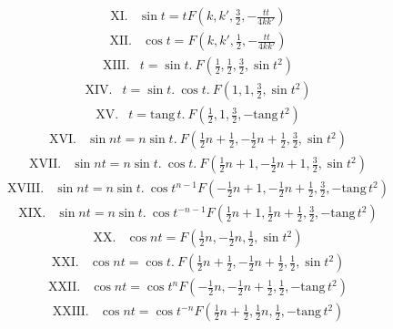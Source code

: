 \[
\begin{array}{rl}
\mathrm{XI.}&\sin t=tF(k,k',\frac{3}{2},-\frac{tt}{4kk'})
\end{array}
\]
\[
\begin{array}{rl}
\mathrm{XII.}&\cos t=F(k,k',\frac{1}{2},-\frac{tt}{4kk'})
\end{array}
\]
\[
\begin{array}{rl}
\mathrm{XIII.}&t=\sin t.\ F(\frac{1}{2},\frac{1}{2},\frac{3}{2},\sin t^2)
\end{array}
\]
\[
\begin{array}{rl}
\mathrm{XIV.}&t=\sin t.\ \cos t.\ F(1,1,\frac{3}{2},\sin t^2)
\end{array}
\]
\[
\begin{array}{rl}
\mathrm{XV.}&t=\mathrm{tang}\,t.\ F(\frac{1}{2},1,\frac{3}{2},-\mathrm{tang}\,t^2)
\end{array}
\]
\[
\begin{array}{rl}
\mathrm{XVI.}&\sin nt=n\sin t.\ F(\frac{1}{2}n+\frac{1}{2},-\frac{1}{2}n+\frac{1}{2},\frac{3}{2},\sin t^2)
\end{array}
\]
\[
\begin{array}{rl}
\mathrm{XVII.}&\sin nt=n\sin t.\ \cos t.\ F(\frac{1}{2}n+1,-\frac{1}{2}n+1,\frac{3}{2},\sin t^2)
\end{array}
\]
\[
\begin{array}{rl}
\mathrm{XVIII.}&\sin nt=n\sin t.\ \cos t^{n-1}F(-\frac{1}{2}n+1,-\frac{1}{2}n+\frac{1}{2},\frac{3}{2},-\mathrm{tang}\,t^2)
\end{array}
\]
\[
\begin{array}{rl}
\mathrm{XIX.}&\sin nt=n\sin t.\ \cos t^{-n-1}F(\frac{1}{2}n+1,\frac{1}{2}n+\frac{1}{2},\frac{3}{2},-\mathrm{tang}\,t^2)
\end{array}
\]
\[
\begin{array}{rl}
\mathrm{XX.}&\cos nt=F(\frac{1}{2}n,-\frac{1}{2}n,\frac{1}{2},\sin t^2)
\end{array}
\]
\[
\begin{array}{rl}
\mathrm{XXI.}&\cos nt=\cos t.\ F(\frac{1}{2}n+\frac{1}{2},-\frac{1}{2}n+\frac{1}{2},\frac{1}{2},\sin t^2)
\end{array}
\]
\[
\begin{array}{rl}
\mathrm{XXII.}&\cos nt=\cos t^nF(-\frac{1}{2}n,-\frac{1}{2}n+\frac{1}{2},\frac{1}{2},-\mathrm{tang}\,t^2)
\end{array}
\]
\[
\begin{array}{rl}
\mathrm{XXIII.}&\cos nt=\cos t^{-n}F(\frac{1}{2}n+\frac{1}{2},\frac{1}{2}n,\frac{1}{2},-\mathrm{tang}\,t^2)
\end{array}
\]
